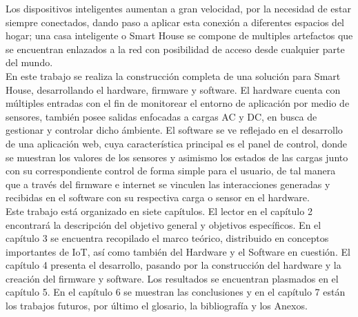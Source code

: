  Los dispositivos inteligentes aumentan a gran velocidad, por la necesidad de estar siempre conectados, dando paso a aplicar esta conexión a diferentes espacios del hogar; una casa inteligente o Smart House se compone de multiples artefactos que se encuentran enlazados a la red con posibilidad de acceso desde cualquier parte del mundo. \\
 
 En este trabajo se realiza la construcción completa de una solución para Smart House, desarrollando el hardware, firmware y software. El hardware cuenta con múltiples entradas con el fin de monitorear el entorno de aplicación por medio de sensores, también posee salidas enfocadas a cargas AC y DC, en busca de gestionar y controlar dicho ámbiente. El software se ve reflejado en el desarrollo de una aplicación web, cuya característica principal es el panel de control, donde se muestran los valores de los sensores y asimismo los estados de las cargas junto con su correspondiente control de forma simple para el usuario, de tal manera que a través del firmware e internet se vinculen las interacciones generadas y recibidas en el software con su respectiva carga o sensor en el hardware.\\
 
 Este trabajo está organizado en siete capítulos. El lector en el capítulo 2 encontrará la descripción del objetivo general y objetivos específicos. En el capítulo 3 se encuentra recopilado el marco teórico, distribuido en conceptos importantes de IoT, así como también del Hardware y el Software en cuestión. El capítulo 4 presenta el desarrollo, pasando por la construcción del hardware y la creación del firmware y software. Los resultados se encuentran plasmados en el capítulo 5. En el capítulo 6 se muestran las conclusiones y en el capítulo 7 están los trabajos futuros, por último el glosario, la bibliografía y los Anexos.\\
 
